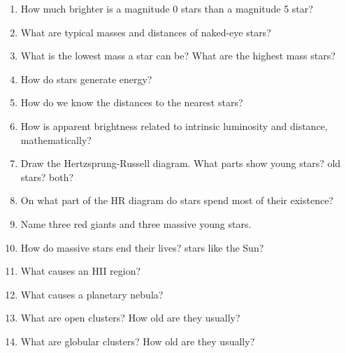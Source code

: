 
\begin{enumerate}
\item How much brighter is a magnitude 0 stars than a magnitude 5 star?
\vspace{80pt}
\item What are typical masses and distances of naked-eye stars?
\vspace{80pt}
\item What is the lowest mass a star can be?  What are the highest
  mass stars?
\vspace{80pt}
\item How do stars generate energy?
\vspace{80pt}
\item How do we know the distances to the nearest stars?
\vspace{80pt}
\item How is apparent brightness related to intrinsic luminosity and
  distance, mathematically?
\vspace{80pt}
\item Draw the Hertzsprung-Russell diagram.  What parts show young
  stars? old stars? both?
\vspace{160pt}
\item On what part of the HR diagram do stars spend most of their existence?
\vspace{80pt}
\item Name three red giants and three massive young stars.
\vspace{80pt}
\item How do massive stars end their lives? stars like the Sun?
\vspace{80pt}
\item What causes an HII region? 
\vspace{80pt}
\item What causes a planetary nebula?
\vspace{80pt}
\item What are open clusters? How old are they usually?
\vspace{80pt}
\item What are globular clusters? How old are they usually?
\vspace{80pt}
\end{enumerate}
